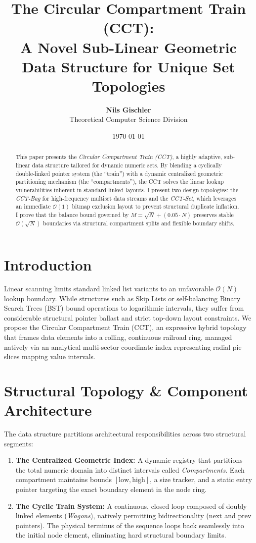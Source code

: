 \documentclass[11pt,a4paper]{article}
\title{\textbf{The Circular Compartment Train (CCT):}\\A Novel Sub-Linear Geometric Data Structure for Unique Set Topologies}
\author{\textbf{Nils Gischler} \\ Theoretical Computer Science Division}
\date{\today}
\begin{document}
\maketitle

\begin{abstract}
This paper presents the \textit{Circular Compartment Train (CCT)}, a highly adaptive, sub-linear data structure tailored for dynamic numeric sets. By blending a cyclically double-linked pointer system (the ``train'') with a dynamic centralized geometric partitioning mechanism (the ``compartments''), the CCT solves the linear lookup vulnerabilities inherent in standard linked layouts. I present two design topologies: the \textit{CCT-Bag} for high-frequency multiset data streams and the \textit{CCT-Set}, which leverages an immediate $\mathcal{O}(1)$ bitmap exclusion layout to prevent structural duplicate inflation. I prove that the balance bound governed by $M = \sqrt{N} + (0.05 \cdot N)$ preserves stable $\mathcal{O}(\sqrt{N})$ boundaries via structural compartment splits and flexible boundary shifts.
\end{abstract}

\section{Introduction}
Linear scanning limits standard linked list variants to an unfavorable $\mathcal{O}(N)$ lookup boundary. While structures such as Skip Lists or self-balancing Binary Search Trees (BST) bound operations to logarithmic intervals, they suffer from considerable structural pointer ballast and strict top-down layout constraints. We propose the Circular Compartment Train (CCT), an expressive hybrid topology that frames data elements into a rolling, continuous railroad ring, managed natively via an analytical multi-sector coordinate index representing radial pie slices mapping value intervals.

\section{Structural Topology \& Component Architecture}
The data structure partitions architectural responsibilities across two structural segments:
\begin{enumerate}
    \item \textbf{The Centralized Geometric Index:} A dynamic registry that partitions the total numeric domain into distinct intervals called \textit{Compartments}. Each compartment maintains bounds $[\text{low}, \text{high}]$, a size tracker, and a static entry pointer targeting the exact boundary element in the node ring.
    \item \textbf{The Cyclic Train System:} A continuous, closed loop composed of doubly linked elements (\textit{Wagons}), natively permitting bidirectionality ($\text{next}$ and $\text{prev}$ pointers). The physical terminus of the sequence loops back seamlessly into the initial node element, eliminating hard structural boundary limits.
\end{enumerate}
\end{document}
